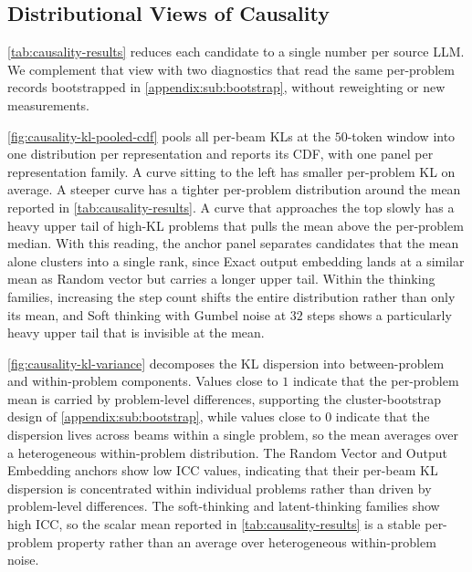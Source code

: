 \subsection{Distributional Views of Causality}
\label{appendix:sub:distributional_views}

\cref{tab:causality-results} reduces each candidate to a single number per source LLM.
We complement that view with two diagnostics that read the same per-problem records bootstrapped in \cref{appendix:sub:bootstrap}, without reweighting or new measurements.

\cref{fig:causality-kl-pooled-cdf} pools all per-beam KLs at the $50$-token
window into one distribution per representation and reports its CDF, with
one panel per representation family. A curve sitting to the left has smaller
per-problem KL on average. A steeper curve has a tighter per-problem
distribution around the mean reported in \cref{tab:causality-results}. A
curve that approaches the top slowly has a heavy upper tail of high-KL
problems that pulls the mean above the per-problem median. With this
reading, the anchor panel separates candidates that the mean alone
clusters into a single rank, since Exact output embedding lands at a similar
mean as Random vector but carries a longer upper tail. Within the thinking
families, increasing the step count shifts the entire distribution rather
than only its mean, and Soft thinking with Gumbel noise at $32$ steps shows
a particularly heavy upper tail that is invisible at the mean.

\cref{fig:causality-kl-variance} decomposes the KL dispersion into
between-problem and within-problem components. Values close to $1$ indicate
that the per-problem mean is carried by problem-level differences, supporting
the cluster-bootstrap design of \cref{appendix:sub:bootstrap}, while values close
to $0$ indicate that the dispersion lives across beams within a single
problem, so the mean averages over a heterogeneous within-problem
distribution.
The Random Vector and Output Embedding anchors show low ICC values, indicating that their per-beam KL dispersion is concentrated within individual problems rather than driven by problem-level differences.
The soft-thinking and latent-thinking families show high ICC, so the scalar mean reported in \cref{tab:causality-results} is a stable per-problem property rather than an average over heterogeneous within-problem noise.




